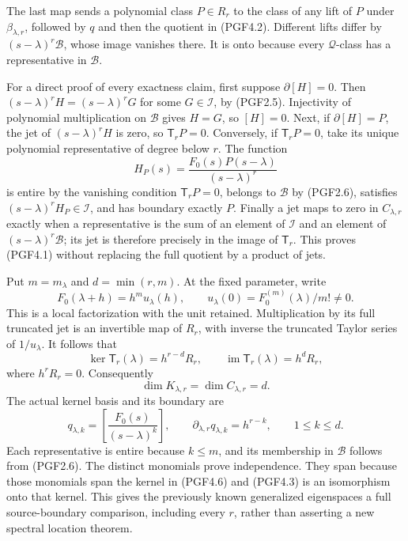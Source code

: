 The last map sends a polynomial class \(P\in R_r\) to the class of any
lift of \(P\) under \(\beta_{\lambda,r}\), followed by \(q\) and then
the quotient in (PGF4.2). Different lifts differ by
\((s-\lambda)^r\mathcal B\), whose image vanishes there. It is onto
because every \(\mathcal Q\)-class has a representative in
\(\mathcal B\).

For a direct proof of every exactness claim, first suppose
\(\partial[H]=0\). Then \((s-\lambda)^rH=(s-\lambda)^rG\) for some
\(G\in\mathcal I\), by (PGF2.5). Injectivity of polynomial
multiplication on \(\mathcal B\) gives \(H=G\), so \([H]=0\). Next, if
\(\partial[H]=P\), the jet of \((s-\lambda)^rH\) is zero, so
\(\mathsf T_r P=0\). Conversely, if \(\mathsf T_r P=0\), take its unique
polynomial representative of degree below \(r\). The function \[
H_P(s)=\frac{F_0(s)P(s-\lambda)}{(s-\lambda)^r}
\tag{PGF4.4}
\] is entire by the vanishing condition \(\mathsf T_rP=0\), belongs to
\(\mathcal B\) by (PGF2.6), satisfies \((s-\lambda)^rH_P\in\mathcal I\),
and has boundary exactly \(P\). Finally a jet maps to zero in
\(C_{\lambda,r}\) exactly when a representative is the sum of an element
of \(\mathcal I\) and an element of \((s-\lambda)^r\mathcal B\); its jet
is therefore precisely in the image of \(\mathsf T_r\). This proves
(PGF4.1) without replacing the full quotient by a product of jets.

Put \(m=m_\lambda\) and \(d=\min(r,m)\). At the fixed parameter, write
\[
F_0(\lambda+h)=h^m u_\lambda(h),\qquad
u_\lambda(0)=F_0^{(m)}(\lambda)/m!\ne0.
\tag{PGF4.5}
\] This is a local factorization with the unit retained. Multiplication
by its full truncated jet is an invertible map of \(R_r\), with inverse
the truncated Taylor series of \(1/u_\lambda\). It follows that \[
\ker\mathsf T_r(\lambda)=h^{r-d}R_r,
\qquad
\operatorname{im}\mathsf T_r(\lambda)=h^dR_r,
\tag{PGF4.6}
\] where \(h^rR_r=0\). Consequently \[
\dim K_{\lambda,r}=\dim C_{\lambda,r}=d.
\tag{PGF4.7}
\] The actual kernel basis and its boundary are \[
q_{\lambda,k}=\left[\frac{F_0(s)}{(s-\lambda)^k}\right],
\qquad
\partial_{\lambda,r}q_{\lambda,k}=h^{r-k},
\qquad 1\le k\le d.
\tag{PGF4.8}
\] Each representative is entire because \(k\le m\), and its membership
in \(\mathcal B\) follows from (PGF2.6). The distinct monomials prove
independence. They span because those monomials span the kernel in
(PGF4.6) and (PGF4.3) is an isomorphism onto that kernel. This gives the
previously known generalized eigenspaces a full source-boundary
comparison, including every \(r\), rather than asserting a new spectral
location theorem.

